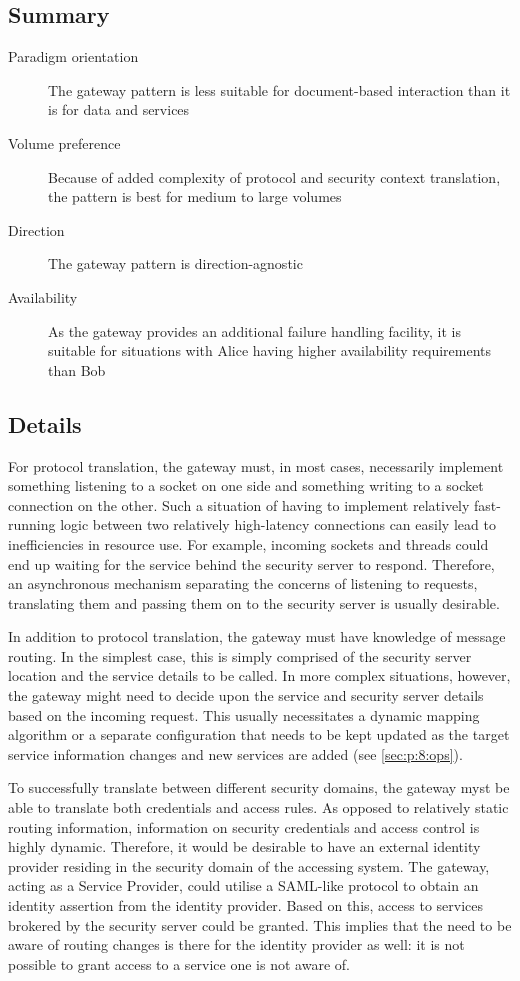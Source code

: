 \documentclass[10pt,a4paper]{article}
\begin{document}
\subsection{Summary}
\begin{description}
	\item[Paradigm orientation] The gateway pattern is less suitable for document-based interaction than it is for data and services
	\item[Volume preference] Because of added complexity of protocol and security context translation, the pattern is best for medium to large volumes
	\item[Direction] The gateway pattern is direction-agnostic 
	\item[Availability] As the gateway provides an additional failure handling facility, it is suitable for situations with Alice having higher availability requirements than Bob
\end{description}

\subsection{Details}
For protocol translation, the gateway must, in most cases, necessarily implement something listening to a socket on one side and something writing to a socket connection on the other. Such a situation of having to implement relatively fast-running logic between two relatively high-latency connections can easily lead to inefficiencies in resource use. For example, incoming sockets and threads could end up waiting for the service behind the security server to respond. Therefore, an asynchronous mechanism separating the concerns of listening to requests, translating them and passing them on to the security server is usually desirable.

In addition to protocol translation, the gateway must have knowledge of message routing. In the simplest case, this is simply comprised of the security server location and the service details to be called. In more complex situations, however, the gateway might need to decide upon the service and security server details based on the incoming request. This usually necessitates a dynamic mapping algorithm or a separate configuration that needs to be kept updated as the target service information changes  and new services are added (see \ref{sec:p:8:ops}). 

To successfully translate between different security domains, the gateway myst be able to translate both credentials and access rules. As opposed to relatively static routing information, information on security credentials and access control is highly dynamic. Therefore, it would be desirable to have an external identity provider residing in the security domain of the accessing system. The gateway, acting as a Service Provider, could utilise a SAML-like protocol to obtain an identity assertion from the identity provider. Based on this, access to services brokered by the security server could be granted. This implies that the need to be aware of routing changes is there for the identity provider as well: it is not possible to grant access to a service one is not aware of. 
\end{document}

